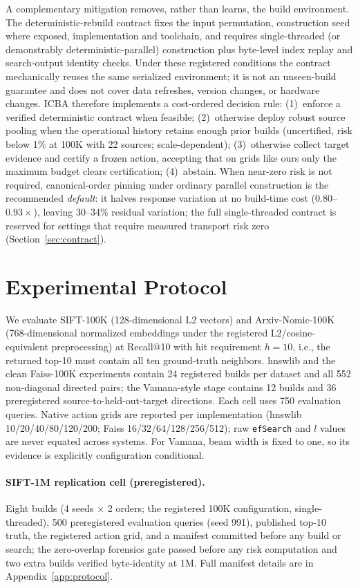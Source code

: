 \documentclass{article}
\begin{document}
A complementary mitigation removes, rather than learns, the build environment. The deterministic-rebuild
contract fixes the input permutation, construction seed where exposed, implementation and toolchain, and
requires single-threaded (or demonstrably deterministic-parallel) construction plus byte-level index replay
and search-output identity checks. Under these registered conditions the contract mechanically reuses the
same serialized environment; it is not an unseen-build guarantee and does not cover data refreshes, version
changes, or hardware changes. ICBA therefore implements a cost-ordered decision rule:
(1)~enforce a verified deterministic contract when feasible;
(2)~otherwise deploy robust source pooling when the operational history retains enough prior builds
(uncertified, risk below 1\% at 100K with 22 sources; scale-dependent);
(3)~otherwise collect target evidence and certify a frozen action, accepting that on grids like ours only
the maximum budget clears certification;
(4)~abstain. When near-zero risk is not required, canonical-order pinning under ordinary parallel construction is the
recommended \emph{default}: it halves response variation at no build-time cost ($0.80$--$0.93\times$),
leaving 30--34\% residual variation; the full single-threaded contract is reserved for settings that
require measured transport risk zero (Section~\ref{sec:contract}).

\section{Experimental Protocol}
\label{sec:protocol}

We evaluate SIFT-100K (128-dimensional L2 vectors) and Arxiv-Nomic-100K (768-dimensional normalized
embeddings under the registered L2/cosine-equivalent preprocessing) at Recall@10 with hit requirement
$h=10$, i.e., the returned top-10 must contain all ten ground-truth neighbors. hnswlib and the clean
Faiss-100K experiments contain 24 registered builds per dataset and all 552 non-diagonal directed pairs;
the Vamana-style stage contains 12 builds and 36 preregistered source-to-held-out-target directions. Each
cell uses 750 evaluation queries. Native action grids are reported per implementation (hnswlib
10/20/40/80/120/200; Faiss 16/32/64/128/256/512); raw \texttt{efSearch} and $l$ values are never equated
across systems. For Vamana, beam width is fixed to one, so its evidence is explicitly configuration
conditional.

\paragraph{SIFT-1M replication cell (preregistered).}
Eight builds (4 seeds $\times$ 2 orders; the registered 100K configuration, single-threaded), 500
preregistered evaluation queries (seed 991), published top-10 truth, the registered action grid, and a
manifest committed before any build or search; the zero-overlap forensics gate passed before any risk
computation and two extra builds verified byte-identity at 1M. Full manifest details are in
Appendix~\ref{app:protocol}.
\end{document}
